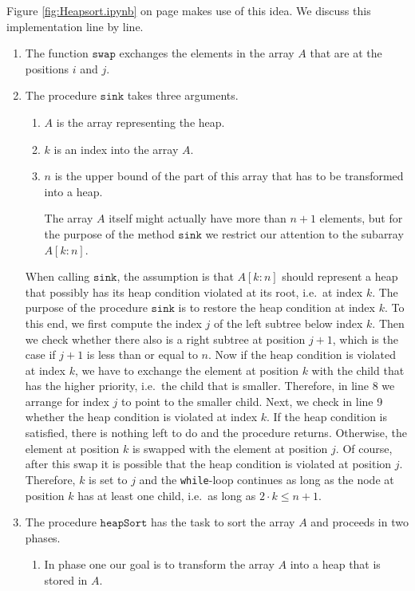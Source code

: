 Figure \ref{fig:Heapsort.ipynb} on page \pageref{fig:Heapsort.ipynb} makes use of this idea.
We discuss this implementation line by line.
\begin{enumerate}
\item The function $\texttt{swap}$ exchanges the elements in the array ${A}$ that are at the
      positions $i$ and $j$.
\item The procedure $\texttt{sink}$ takes three arguments.
      \begin{enumerate}
      \item ${A}$ is the array representing the heap.
      \item ${k}$ is an index into the array ${A}$.
      \item ${n}$ is the upper bound  of the part of this array that has to be transformed into a heap.  

            The array ${A}$ itself might actually have more than $n+1$ elements, but for the
            purpose of the method $\texttt{sink}$ we restrict our attention to the subarray
            ${A[k:n]}$. 
      \end{enumerate}
      When calling $\texttt{sink}$, the assumption is that $A[{k:n}]$ should represent a heap 
      that possibly has its heap condition violated at its root, i.e.~at index ${k}$.  The
      purpose of the procedure $\texttt{sink}$ is to restore the heap condition at index ${k}$.
      To this end, we first compute the index ${j}$ of the left subtree below index ${k}$.
      Then we check whether there also is a right subtree at position ${j}+1$, which is the
      case if $j + 1$ is less than or equal to  ${n}$.  Now if the heap condition is violated at index
      ${k}$, we have to exchange the element at  position ${k}$ with the child that has
      the higher priority, i.e.~the child that is smaller. Therefore, in line 8 we arrange for index
      ${j}$ to point to the smaller child.  Next, we check in line 9 whether the heap
      condition is violated at index ${k}$.  If the heap condition is satisfied, there is
      nothing left to do and the procedure returns.  Otherwise, the element at position ${k}$ is swapped with
      the element at position ${j}$.  Of course, after this swap it is possible that the heap condition is
      violated at position ${j}$.  Therefore,  ${k}$ is set to ${j}$ and the \texttt{while}-loop continues
      as long as the node at position ${k}$ has at least one child, i.e.~as long as 
      $2 \cdot {k}\leq {n} + 1$.
\item The procedure $\texttt{heapSort}$ has the task to sort the array ${A}$ and proceeds in two phases.
      \begin{enumerate}
      \item In phase one our goal is to transform the array ${A}$ into a heap that is stored in ${A}$.


\end{enumerate}
\end{enumerate}
